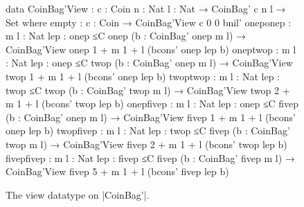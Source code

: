 \begin{figure*}
\setlength{\mathindent}{1em}
\setlength{\abovedisplayskip}{0em}
\begin{code}
data CoinBag'View : {c : Coin} {n : Nat} {l : Nat} → CoinBag' c n l → Set where
  empty       : {c : Coin} → CoinBag'View {c} {0} {0} bnil'
  oneponep    : {m l : Nat} {lep : onep ≤C onep} (b : CoinBag' onep m l) → CoinBag'View {onep} {1 + m} {1 + l} (bcons' onep lep b)
  oneptwop    : {m l : Nat} {lep : onep ≤C twop} (b : CoinBag' onep m l) → CoinBag'View {twop} {1 + m} {1 + l} (bcons' onep lep b)
  twoptwop    : {m l : Nat} {lep : twop ≤C twop} (b : CoinBag' twop m l) → CoinBag'View {twop} {2 + m} {1 + l} (bcons' twop lep b)
  onepfivep   : {m l : Nat} {lep : onep ≤C fivep} (b : CoinBag' onep m l) → CoinBag'View {fivep} {1 + m} {1 + l} (bcons' onep lep b)
  twopfivep   : {m l : Nat} {lep : twop ≤C fivep} (b : CoinBag' twop m l) → CoinBag'View {fivep} {2 + m} {1 + l} (bcons' twop lep b)
  fivepfivep  : {m l : Nat} {lep : fivep ≤C fivep} (b : CoinBag' fivep m l) → CoinBag'View {fivep} {5 + m} {1 + l} (bcons' fivep lep b)
\end{code}
\caption{The view datatype on |CoinBag'|.}
\label{fig:CoinBag'View}
\end{figure*}

